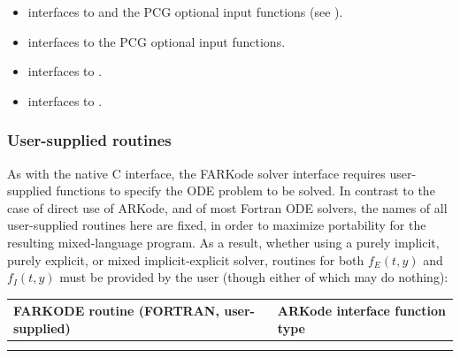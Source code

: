 \documentclass[letterpaper,10pt,english]{sphinxmanual}
\begin{document}
\begin{itemize}
\item {} 
{\hyperref[f_interface/Usage:f/_/FARKMASSPCG]{\emph{}}} interfaces to {\hyperref[c_interface/User_callable:c.ARKMassPcg]{\emph{}}} and the
PCG optional input functions (see
{\hyperref[c_interface/User_callable:cinterface-arkspilsinputtable]{\emph{}}}).

\item {} 
{\hyperref[f_interface/Usage:f/_/FARKMASSPCGREINIT]{\emph{}}} interfaces to the PCG optional input
functions.

\item {} 
{\hyperref[f_interface/Usage:f/_/FARKSPILSSETMASS]{\emph{}}} interfaces to
{\hyperref[c_interface/User_callable:c.ARKSpilsSetMassTimesVecFn]{\emph{}}}.

\item {} 
{\hyperref[f_interface/Usage:f/_/FARKSPILSSETMASSPREC]{\emph{}}} interfaces to
{\hyperref[c_interface/User_callable:c.ARKSpilsSetMassPreconditioner]{\emph{}}}.

\end{itemize}


\subsubsection{User-supplied routines}
\label{f_interface/Routines:finterface-usersupplied}\label{f_interface/Routines:user-supplied-routines}
As with the native C interface, the FARKode solver interface requires
user-supplied functions to specify the ODE problem to be solved.  In
contrast to the case of direct use of ARKode, and of most Fortran ODE
solvers, the names of all user-supplied routines here are fixed, in
order to maximize portability for the resulting mixed-language program.
As a result, whether using a purely implicit, purely explicit, or
mixed implicit-explicit solver, routines for both \(f_E(t,y)\) and
\(f_I(t,y)\) must be provided by the user (though either of which
may do nothing):

\begin{tabulary}{\linewidth}{|L|L|}
\hline
\textsf{\relax 
FARKODE routine
(FORTRAN, user-supplied)
} & \textsf{\relax 
ARKode interface
function type
}\\
\hline
{\hyperref[f_interface/Usage:f/_/FARKIFUN]{\emph{}}}
 & 
{\hyperref[c_interface/User_supplied:c.ARKRhsFn]{\emph{}}}
\\
\hline
{\hyperref[f_interface/Usage:f/_/FARKEFUN]{\emph{}}}
 & 
{\hyperref[c_interface/User_supplied:c.ARKRhsFn]{\emph{}}}
\\
\hline\end{tabulary}
\end{document}
